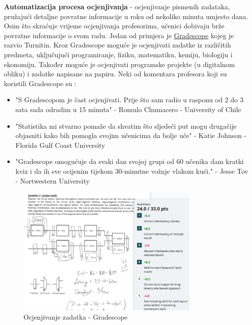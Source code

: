 \documentclass[]{foi}
\begin{document}
    \textbf{Automatizacija procesa ocjenjivanja} - ocjenjivanje pismenih zadataka, pružajući detaljne povratne informacije u roku od nekoliko minuta umjesto dana. 
    Osim što skraćuje vrijeme ocjenjivanja profesorima, učenici dobivaju brže povratne informacije o svom radu. Jedan od primjera je \href{https://www.gradescope.com/}{\underline{Gradescope}} kojeg je razvio Turnitin. 
    Kroz Gradescope moguće je ocjenjivati zadatke iz različitih predmeta, uključujući programiranje, fiziku, matematiku, kemiju, biologiju i ekonomiju. Također moguće je ocjenjivati
    programske projekte (u digitalnom obliku) i zadatke napisane na papiru. Neki od komentara profesora koji su koristili Gradescope su \cite{gradescope2025}:  
    \begin{itemize}
        \item "S Gradescopom je čast ocjenjivati. Prije što sam radio u rasponu od 2 do 3 sata sada odradim u 15 minuta" - Romulo Chumacero - University of Chile
        \item "Statistika mi stvarno pomaže da shvatim što sljedeći put mogu drugačije objasniti kako bih pomogla svojim učenicima da bolje uče" - Katie Johnson - Florida Gulf Coast University
        \item "Gradescope omogućuje da svaki dan svojoj grupi od 60 učenika dam kratki kviz i da ih sve ocijenim tijekom 30-minutne vožnje vlakom kući." -  Jesse Tov - Nortwestern University
    \end{itemize}

    \begin{figure}[ht!]
    \centering
    \includegraphics[width=0.8\textwidth]{./assets/Gradescope.png} 
    \caption{Ocjenjivanje zadatka - Gradescope \cite{gradescope2025}}
    \label{fig:slika7}
    \end{figure}
\end{document}
